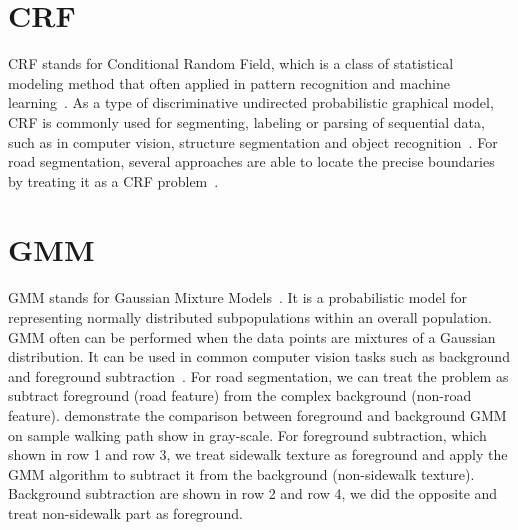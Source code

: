 \section{\ac{CRF}}
\ac{CRF} stands for Conditional Random Field, which is a class of statistical modeling method that often applied in pattern recognition and machine learning~\cite{MAL-013}. 
As a type of discriminative undirected probabilistic graphical model, \ac{CRF} is commonly used for segmenting, labeling or parsing of sequential data, such as in computer vision, structure segmentation and object recognition~\cite{RuizSarmiento2015UPGMppA, 1315232, lafferty2001conditional}. 
For road segmentation, several approaches are able to locate the precise boundaries by treating it as a \ac{CRF} problem~\cite{ActiveContou09, Achanta:149300}. 

\section{\ac{GMM}}

\ac{GMM} stands for Gaussian Mixture Models~\cite{sridharan2014gaussian}.
It is a probabilistic model for representing normally distributed subpopulations within an overall population.
\ac{GMM} often can be performed when the data points are mixtures of a Gaussian distribution. 
It can be used in common computer vision tasks such as background and foreground subtraction~\cite{1333992}. 
For road segmentation, we can treat the problem as subtract foreground (road feature) from the complex background (non-road feature). 
 demonstrate the comparison between foreground and background \ac{GMM} on sample walking path show in gray-scale. 
For foreground subtraction, which shown in row 1 and row 3, we treat sidewalk texture as foreground and apply the \ac{GMM} algorithm to subtract it from the background (non-sidewalk texture). 
Background subtraction are shown in row 2 and row 4, we did the opposite and treat non-sidewalk part as foreground. 

